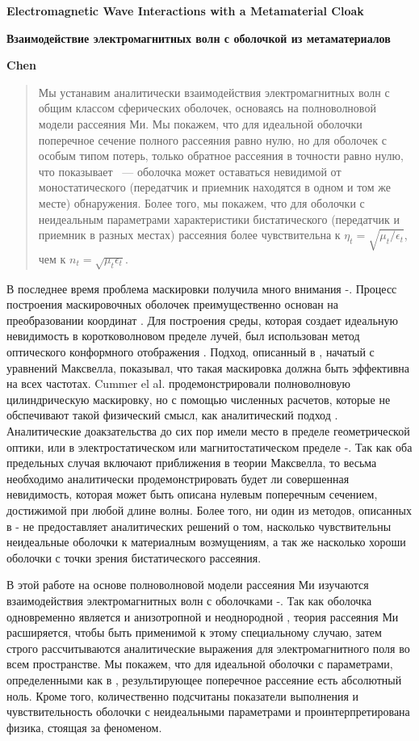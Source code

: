 \documentclass[a4paper, 12pt]{article}
\newcommand{\tit}[1]{\begin{center}{\bf{\Large #1}}\end{center}}
\newcommand{\aut}[1]{\centerline{{\bf #1}}}
\begin{document}
\sloppy
\tit{Electromagnetic Wave Interactions with a Metamaterial Cloak}
\tit{Взаимодействие электромагнитных волн с оболочкой из метаматериалов}
\aut{Chen}

\begin{abstract}
Мы устанавим аналитически взаимодействия электромагнитных волн с общим
классом сферических оболочек, основаясь на полноволновой модели рассеяния Ми.
Мы покажем, что для идеальной оболочки поперечное сечение полного рассеяния равно
нулю, но для оболочек с особым типом потерь, только обратное рассеяния в точности 
равно нулю, что показывает ~--- оболочка может оставаться невидимой от 
моностатического (передатчик и приемник находятся в одном и том же месте) 
обнаружения. Более того, мы покажем, что для оболочки с неидеальным параметрами
характеристики бистатического (передатчик и приемник в разных местах) рассеяния
более чувствительна к $\eta_t=\sqrt{\mu_t/\epsilon_t}$, чем
к $n_t=\sqrt{\mu_t\epsilon_t}$.
\end{abstract}


В последнее время проблема маскировки получила много внимания \cite{1}-\cite{11}.
Процесс построения маскировочных оболочек преимущественно основан на 
преобразовании координат \cite{4}. 
Для построения среды, которая создает идеальную невидимость в коротковолновом 
пределе лучей, был использован метод оптического конформного отображения 
\cite{6}. Подход, описанный в \cite{4}, начатый с уравнений Максвелла, 
показывал, что такая маскировка должна быть эффективна на всех частотах. 
Cummer el al. продемонстрировали полноволновую цилиндрическую маскировку, но с 
помощью численных расчетов, которые не обспечивают такой физический смысл, как 
аналитический подход \cite{2}. Аналитические доакзательства до сих пор 
имели место в пределе геометрической оптики, или в электростатическом или 
магнитостатическом пределе \cite{4}-\cite{6}. 
Так как оба предельных случая включают приближения в теории Максвелла, то весьма 
необходимо аналитически продемонстрировать
будет ли совершенная невидимость, которая может быть описана
нулевым поперечным сечением, достижимой при любой длине волны.  
Более того, ни один из методов, описанных в \cite{4}-\cite{6} 
не предоставляет аналитических решений о том, насколько чувствительны неидеальные 
оболочки к материалным возмущениям, а так же насколько хороши оболочки с точки 
зрения бистатического рассеяния.

В этой работе на основе полноволновой модели рассеяния Ми изучаются 
взаимодействия электромагнитных волн с оболочками \cite{12}-\cite{14}. 
Так как оболочка
одновременно является и анизотропной и неоднородной \cite{4}, теория рассеяния
Ми расширяется, чтобы быть применимой к этому специальному случаю, затем строго
рассчитываются аналитические выражения для электромагнитного поля во всем 
пространстве. 
Мы покажем, что для идеальной оболочки с параметрами, определенными
как в \cite{4}, результирующее поперечное рассеяние есть абсолютный ноль. 
Кроме того, количественно подсчитаны показатели выполнения и чувствительность 
оболочки с неидеальными параметрами и проинтерпретирована физика, стоящая за 
феноменом.
\end{document}
